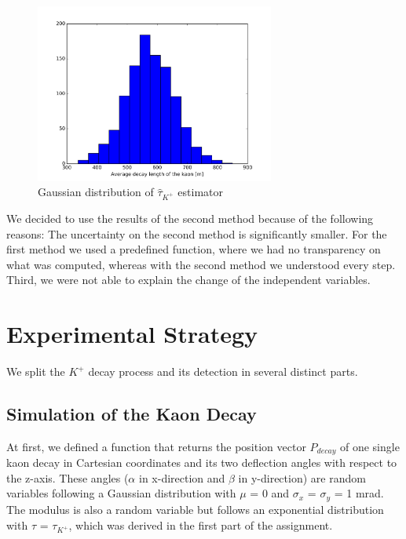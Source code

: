 \documentclass[a4paper,parskip,11pt, DIV12]{scrreprt}
\begin{document}
	\begin{figure}[htbp] 
		\centering
		\includegraphics[width=0.7\textwidth]{hist_tau_estimator3.jpg}
		\caption{Gaussian distribution of $\hat{\tau}_{K^+}$ estimator}
		\label{fig:Bild1}
	\end{figure}
	
	We decided to use the results of the second method because of the following reasons: The uncertainty on the second method is significantly smaller. For the first method we used a predefined function, where we had no transparency on what was computed, whereas with the second method we understood every step. Third, we were not able to explain the change of the independent variables. 
	
	\clearpage
	
	
	\chapter{Experimental Strategy}
	
	
	We split the $K^+$ decay process and its detection in several distinct parts.
	
	\section{Simulation of the Kaon Decay} \label{sec:kdecay}
	
	At first, we defined a function that returns the position vector $P_{decay}$ of one single kaon decay in Cartesian coordinates and its two deflection angles with respect to the z-axis. These angles ($\alpha$ in x-direction and $\beta$ in y-direction) are random variables following a Gaussian distribution with $\mu$ = 0 and $\sigma_x$ = $\sigma_y$ = 1 mrad. The modulus is also a random variable but follows an exponential distribution with $\tau$ = $\tau_{K^+}$, which was derived in the first part of the assignment.
	
\end{document}
